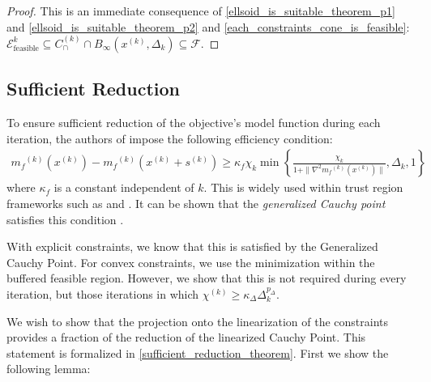 \documentclass{article}
\theoremstyle{case}
\numberwithin{theorem}{subsection}
\newcommand{\capcones}{{C^{(k)}_{\cap}}}
\newcommand{\chik}{{\chi^{(k)}}}
\newcommand{\dk}{\Delta_k}
\newcommand{\dmax}{\Delta_{\textrm{max}}}
\newcommand{\feasible}{{\mathcal F}}
\newcommand{\mfk}{{{m}_f}^{(k)}}
\newcommand{\naturals}{\mathbb N}
\newcommand{\sk}{{{s}^{(k)}}}
\newcommand{\tr}{{ B_{\infty}\left(\xk, \dk\right) }}
\newcommand{\unshiftedellipsoid}{{\mathcal E^k_{\textrm{feasible}}}}
\newcommand{\xk}{{x^{(k)}}}
\begin{document}
\begin{proof}
This is an immediate consequence of \cref{ellsoid_is_suitable_theorem_p1} and \cref{ellsoid_is_suitable_theorem_p2} and \cref{each_constraints_cone_is_feasible}:
$\unshiftedellipsoid \subseteq \capcones \cap \tr \subseteq \feasible$.
\end{proof}






\subsection{Sufficient Reduction}
\label{sufficient_reduction_section}

To ensure sufficient reduction of the objective's model function during each iteration, the authors of \cite{Conejo:2013:GCT:2620806.2621814} impose the following efficiency condition:
\begin{align}
\label{efficiency}
\mfk(\xk) - \mfk(\xk + \sk) \ge \kappa_f \chi_k \min\left\{ \frac{\chi_k}{1+\|\nabla^2 \mfk(\xk)\|}, \dk, 1 \right\}
\end{align}
where $\kappa_f$ is a constant independent of $k$.
This is widely used within trust region frameworks such as \cite{Conejo:2013:GCT:2620806.2621814} and \cite{Conn:2000:TM:357813}.
It can be shown that the \emph{generalized Cauchy point} satisfies this condition \cite{Conn:2000:TM:357813}.



With explicit constraints, we know that this is satisfied by the Generalized Cauchy Point.
For convex constraints, we use the minimization within the buffered feasible region.
However, we show that this is not required during every iteration, but those iterations in which $\chik \ge \kappa_{\Delta}\dk^{p_{\Delta}}$.


We wish to show that the projection onto the linearization of the constraints provides a fraction of the reduction of the linearized Cauchy Point.
This statement is formalized in \cref{sufficient_reduction_theorem}.
First we show the following lemma:
\end{document}
